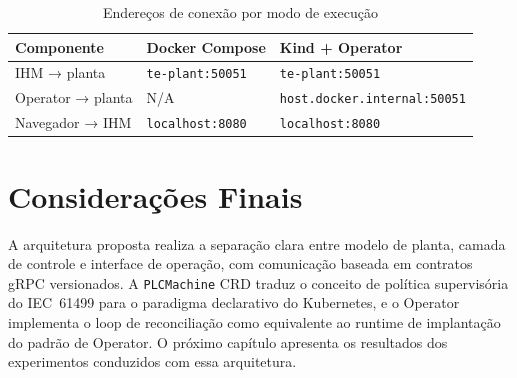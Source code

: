 \begin{table}[ht!]
\centering
\caption{Endereços de conexão por modo de execução}
\label{tab:conectividade}
\begin{tabular}{|l|l|l|}
\hline
\textbf{Componente}       & \textbf{Docker Compose}      & \textbf{Kind + Operator} \\
\hline
IHM → planta              & \texttt{te-plant:50051}      & \texttt{te-plant:50051}  \\
Operator → planta         & N/A                          & \texttt{host.docker.internal:50051} \\
Navegador → IHM           & \texttt{localhost:8080}      & \texttt{localhost:8080}  \\
\hline
\end{tabular}
\end{table}

\section{Considerações Finais}
\label{sec:dev_conclusao}

A arquitetura proposta realiza a separação clara entre modelo de planta, camada de controle e interface de operação, com comunicação baseada em contratos gRPC versionados. A \texttt{PLCMachine} CRD traduz o conceito de política supervisória do IEC~61499 para o paradigma declarativo do Kubernetes, e o Operator implementa o loop de reconciliação como equivalente ao runtime de implantação do padrão de Operator. O próximo capítulo apresenta os resultados dos experimentos conduzidos com essa arquitetura.
